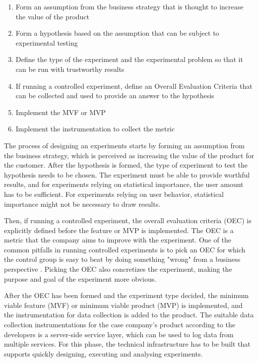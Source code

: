 \documentclass[english, grading]{tktltiki2}
\theoremstyle{definition}
\theoremstyle{remark}
\begin{document}
\begin{enumerate}
  \item Form an assumption from the business strategy that is thought to increase the value of the product
  \item Form a hypothesis based on the assumption that can be subject to experimental testing 
  \item Define the type of the experiment and the experimental problem so that it can be run with trustworthy results
  \item If running a controlled experiment, define an Overall Evaluation Criteria that can be collected and used to provide an answer to the hypothesis  
  \item Implement the MVF or MVP
  \item Implement the instrumentation to collect the metric
\end{enumerate}

The process of designing an experiments starts by forming an assumption from the business strategy, which is perceived as increasing the value of the product for the customer. After the hypothesis is formed, the type of experiment to test the hypothesis needs to be chosen. The experiment must be able to provide worthful results, and for experiments relying on statistical importance, the user amount has to be sufficient. For experiments relying on user behavior, statistical importance might not be necessary to draw results.

Then, if running a controlled experiment, the overall evaluation criteria (OEC) is explicitly defined before the feature or MVP is implemented. The OEC is a metric that the company aims to improve with the experiment. One of the common pitfalls in running controlled experiments is to pick an OEC for which the control group is easy to beat by doing something "wrong" from a business perspective \cite{crook2009seven}. Picking the OEC also concretizes the experiment, making the purpose and goal of the experiment more obvious. 

After the OEC has been formed and the experiment type decided, the minimum viable feature (MVF) or minimum viable product (MVP) is implemented, and the instrumentation for data collection is added to the product. The suitable data collection instrumentations for the case company's product according to the developers is a server-side service layer, which can be used to log data from multiple services. For this phase, the technical infrastructure has to be built that supports quickly designing, executing and analysing experiments.  
\end{document}
